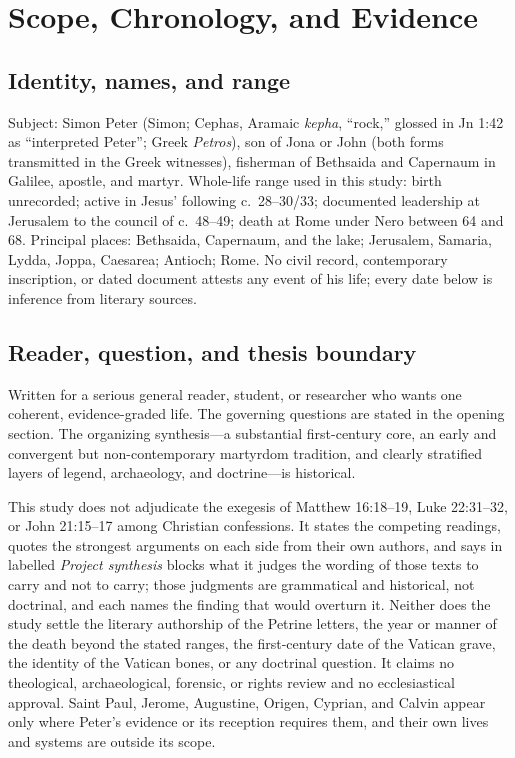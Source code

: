 \section{Scope, Chronology, and Evidence}

\subsection{Identity, names, and range}

Subject: Simon Peter (Simon; Cephas, Aramaic \textit{kepha}, ``rock,''
glossed in Jn 1:42 as ``interpreted Peter''; Greek \textit{Petros}), son of
Jona or John (both forms transmitted in the Greek witnesses), fisherman of
Bethsaida and Capernaum in Galilee, apostle, and martyr. Whole-life range
used in this study: birth unrecorded; active in Jesus' following c.~28--30/33;
documented leadership at Jerusalem to the council of c.~48--49; death at Rome
under Nero between 64 and 68. Principal places: Bethsaida, Capernaum, and the
lake; Jerusalem, Samaria, Lydda, Joppa, Caesarea; Antioch; Rome. No civil
record, contemporary inscription, or dated document attests any event of
his life; every date below is inference from literary sources.

\subsection{Reader, question, and thesis boundary}

Written for a serious general reader, student, or researcher who wants one
coherent, evidence-graded life. The governing questions are stated in the
opening section. The organizing synthesis---a substantial first-century
core, an early and convergent but non-contemporary martyrdom tradition,
and clearly stratified layers of legend, archaeology, and doctrine---is
historical.

This study does not adjudicate the exegesis of Matthew 16:18--19, Luke
22:31--32, or John 21:15--17 among Christian confessions. It states the
competing readings, quotes the strongest arguments on each side from their
own authors, and says in labelled \emph{Project synthesis} blocks what it
judges the wording of those texts to carry and not to carry; those judgments
are grammatical and historical, not doctrinal, and each names the finding
that would overturn it. Neither does the study settle the literary authorship
of the Petrine letters, the year or manner of the death beyond the stated
ranges, the first-century date of the Vatican grave, the identity of the
Vatican bones, or any doctrinal question. It claims no theological,
archaeological, forensic, or rights review and no ecclesiastical approval.
Saint Paul, Jerome, Augustine, Origen, Cyprian, and Calvin appear only where
Peter's evidence or its reception requires them, and their own lives and
systems are outside its scope.

